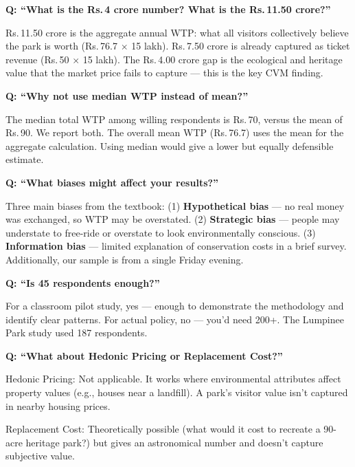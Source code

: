 \documentclass[11pt, a4paper]{article}
\newcommand{\rupee}{Rs.\,}
\newenvironment{ansbox}{%
    \def\FrameCommand{\textcolor{darkgreen}{\vrule width 2pt}\hspace{8pt}}%
    \MakeFramed{\advance\hsize-\width\FrameRestore}%
}{%
    \endMakeFramed%
}
\begin{document}
\textbf{Q: ``What is the \rupee 4 crore number? What is the \rupee 11.50 crore?''}
\begin{ansbox}
\rupee 11.50 crore is the aggregate annual WTP: what all visitors collectively believe the park is worth (\rupee 76.7 $\times$ 15 lakh). \rupee 7.50 crore is already captured as ticket revenue (\rupee 50 $\times$ 15 lakh). The \rupee 4.00 crore gap is the ecological and heritage value that the market price fails to capture --- this is the key CVM finding.
\end{ansbox}

\textbf{Q: ``Why not use median WTP instead of mean?''}
\begin{ansbox}
The median total WTP among willing respondents is \rupee 70, versus the mean of \rupee 90. We report both. The overall mean WTP (\rupee 76.7) uses the mean for the aggregate calculation. Using median would give a lower but equally defensible estimate.
\end{ansbox}

\textbf{Q: ``What biases might affect your results?''}
\begin{ansbox}
Three main biases from the textbook: (1) \textbf{Hypothetical bias} --- no real money was exchanged, so WTP may be overstated. (2) \textbf{Strategic bias} --- people may understate to free-ride or overstate to look environmentally conscious. (3) \textbf{Information bias} --- limited explanation of conservation costs in a brief survey. Additionally, our sample is from a single Friday evening.
\end{ansbox}

\textbf{Q: ``Is 45 respondents enough?''}
\begin{ansbox}
For a classroom pilot study, yes --- enough to demonstrate the methodology and identify clear patterns. For actual policy, no --- you'd need 200+. The Lumpinee Park study used 187 respondents.
\end{ansbox}

\textbf{Q: ``What about Hedonic Pricing or Replacement Cost?''}
\begin{ansbox}
Hedonic Pricing: Not applicable. It works where environmental attributes affect property values (e.g., houses near a landfill). A park's visitor value isn't captured in nearby housing prices.

Replacement Cost: Theoretically possible (what would it cost to recreate a 90-acre heritage park?) but gives an astronomical number and doesn't capture subjective value.
\end{ansbox}
\end{document}
